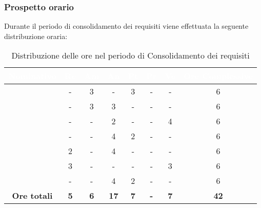 \subsubsection{Prospetto orario}
Durante il periodo di consolidamento dei requisiti viene effettuata la seguente distribuzione oraria:
\begin{table}[H]
	\begin{center}
		\begin{tabular}{ |c c c c c c c c| }
		\rowcolor{darkblue} 
		\textcolor{white}{\textbf{Nominativo}} & \textcolor{white}{\textbf{Re}} & \textcolor{white}{\textbf{Am}} & \textcolor{white}{\textbf{An}} & \textcolor{white}{\textbf{Pt}} & \textcolor{white}{\textbf{Pr}} & \textcolor{white}{\textbf{Ve}} & \textcolor{white}{\textbf{Ore Complessive}} \\ \hline
		\BL 	& - 	& 3  	& - 	& 3 	& - 	& - 	& 6 \\ \hline
		\FF 	& - 	& 3  	& 3 	& - 	& - 	& -  	& 6 \\ \hline
		\MM 	& -  	& -  	& 2 	& - 	& - 	& 4  	& 6 \\ \hline
		\PC 	& - 	& -  	& 4 	& 2 	& - 	& - 	& 6 \\ \hline
		\TG 	& 2  	& - 	& 4 	& - 	& - 	& - 	& 6 \\ \hline
		\TL 	& 3  	& - 	& - 	& - 	& - 	& 3 	& 6 \\ \hline
		\VD 	& -  	& -  	& 4 	& 2 	& - 	& -  	& 6 \\ \hline
		\textbf{Ore totali} & \textbf{5} & \textbf{6} & \textbf{17} & \textbf{7} & \textbf{-} & \textbf{7} & \textbf{42} \\ \hline
		\end{tabular}
	\caption{Distribuzione delle ore nel periodo di Consolidamento dei requisiti}
	\end{center}
\end{table}
